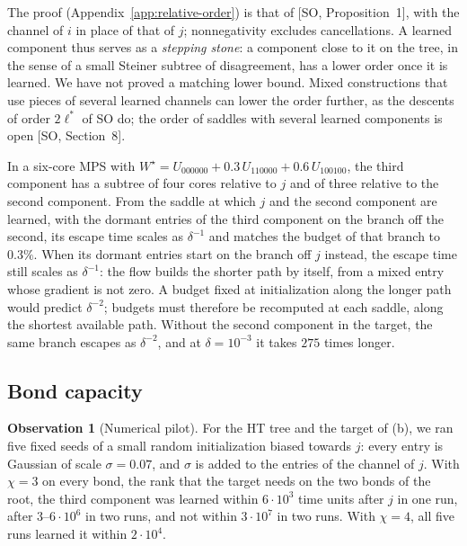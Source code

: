 \documentclass[11pt]{article}
\newcommand{\SO}{\textsf{SO}}
\newcommand{\so}[1]{[\SO, #1]}
\theoremstyle{definition}
\newtheorem{observation}[theorem]{Observation}
\numberwithin{equation}{section}
\begin{document}
The proof (Appendix~\ref{app:relative-order}) is that of \so{Proposition~1}, with the channel of $i$ in place of that of $j$; nonnegativity excludes cancellations. A learned component thus serves as a \emph{stepping stone}: a component close to it on the tree, in the sense of a small Steiner subtree of disagreement, has a lower order once it is learned. We have not proved a matching lower bound. Mixed constructions that use pieces of several learned channels can lower the order further, as the descents of order $2\ell^*$ of \SO{} do; the order of saddles with several learned components is open \so{Section~8}.

In a six-core MPS with $W^\star=U_{000000}+0.3\,U_{110000}+0.6\,U_{100100}$, the third component has a subtree of four cores relative to $j$ and of three relative to the second component. From the saddle at which $j$ and the second component are learned, with the dormant entries of the third component on the branch off the second, its escape time scales as $\delta^{-1}$ and matches the budget of that branch to $0.3\%$. When its dormant entries start on the branch off $j$ instead, the escape time still scales as $\delta^{-1}$: the flow builds the shorter path by itself, from a mixed entry whose gradient is not zero. A budget fixed at initialization along the longer path would predict $\delta^{-2}$; budgets must therefore be recomputed at each saddle, along the shortest available path. Without the second component in the target, the same branch escapes as $\delta^{-2}$, and at $\delta=10^{-3}$ it takes $275$ times longer.

\subsection{Bond capacity}\label{sec:capacity}

\begin{observation}[Numerical pilot]\label{obs:capacity}
For the HT tree and the target of (b), we ran five fixed seeds of a small random initialization biased towards $j$: every entry is Gaussian of scale $\sigma=0.07$, and $\sigma$ is added to the entries of the channel of $j$. With $\chi=3$ on every bond, the rank that the target needs on the two bonds of the root, the third component was learned within $6\cdot10^3$ time units after $j$ in one run, after $3$--$6\cdot10^6$ in two runs, and not within $3\cdot10^7$ in two runs. With $\chi=4$, all five runs learned it within $2\cdot10^4$.
\end{observation}
\end{document}
